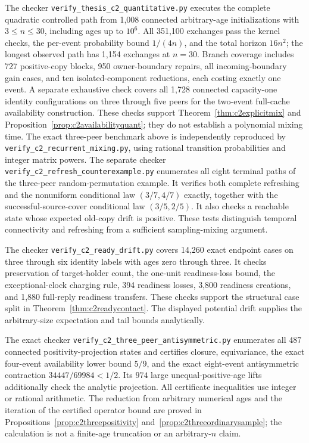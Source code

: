 \documentclass[11pt]{article}
\begin{document}
The checker \texttt{verify\_thesis\_c2\_quantitative.py}
executes the complete quadratic controlled path from 1,008
connected arbitrary-age initializations with $3\le n\le30$,
including ages up to $10^6$. All 351,100 exchanges pass the
kernel checks, the per-event probability bound $1/(4n)$,
and the total horizon $16n^2$; the longest observed path
has 1,154 exchanges at $n=30$. Branch coverage includes
727 positive-copy blocks, 950 owner-boundary repairs,
all incoming-boundary gain cases, and ten isolated-component
reductions, each costing exactly one event. A separate
exhaustive check covers all 1,728 connected capacity-one
identity configurations on three through five peers for
the two-event full-cache availability construction.
These checks support Theorem~\ref{thm:c2explicitmix}
and Proposition~\ref{prop:c2availabilityquant}; they do
not establish a polynomial mixing time. The exact
three-peer benchmark above is independently reproduced by
\texttt{verify\_c2\_recurrent\_mixing.py}, using rational
transition probabilities and integer matrix powers.
The separate checker
\texttt{verify\_c2\_refresh\_counterexample.py} enumerates
all eight terminal paths of the three-peer random-permutation
example. It verifies both complete refreshing and the
nonuniform conditional law $(3/7,4/7)$ exactly, together
with the successful-source-cover conditional law $(3/5,2/5)$.
It also checks a reachable state whose expected old-copy drift
is positive. These tests distinguish temporal connectivity
and refreshing from a sufficient sampling-mixing argument.

The checker \texttt{verify\_c2\_ready\_drift.py} covers
14,260 exact endpoint cases on three through six identity
labels with ages zero through three. It checks preservation
of target-holder count, the one-unit readiness-loss bound,
the exceptional-clock charging rule, 394 readiness losses,
3,800 readiness creations, and 1,880 full-reply readiness
transfers. These checks support the structural case split
in Theorem~\ref{thm:c2readycontact}. The displayed
potential drift supplies the arbitrary-size expectation
and tail bounds analytically.

The exact checker
\texttt{verify\_c2\_three\_peer\_antisymmetric.py}
enumerates all $487$ connected positivity-projection states
and certifies closure, equivariance, the exact four-event
availability lower bound $5/9$, and the exact eight-event
antisymmetric contraction $34447/69984<1/2$.
Its $974$ large unequal-positive-age lifts additionally
check the analytic projection. All certificate inequalities
use integer or rational arithmetic. The reduction from
arbitrary numerical ages and the iteration of the certified
operator bound are proved in
Propositions~\ref{prop:c2threepositivity}
and~\ref{prop:c2threeordinarysample}; the calculation is
not a finite-age truncation or an arbitrary-$n$ claim.
\end{document}
